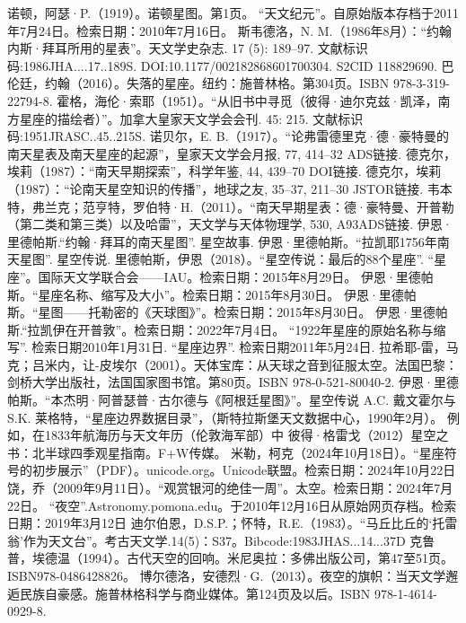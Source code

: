 \begin{enumerate}
 诺顿，阿瑟·P.（1919）。诺顿星图。第1页。
 “天文纪元”。自原始版本存档于2011年7月24日。检索日期：2010年7月16日。
 斯韦德洛，N. M.（1986年8月）：“约翰内斯·拜耳所用的星表”。天文学史杂志. 17 (5): 189–97. 文献标识码:1986JHA....17..189S. DOI:10.1177/002182868601700304. S2CID 118829690.
 巴伦廷，约翰（2016）。失落的星座。纽约：施普林格。第304页。ISBN 978-3-319-22794-8.
 霍格，海伦·索耶（1951）。“从旧书中寻觅（彼得·迪尔克兹·凯泽，南方星座的描绘者）”。加拿大皇家天文学会会刊. 45: 215. 文献标识码:1951JRASC..45..215S.
 诺贝尔，E. B.（1917）。“论弗雷德里克·德·豪特曼的南天星表及南天星座的起源”，皇家天文学会月报, 77, 414–32 ADS链接.
 德克尔，埃莉（1987）：“南天早期探索”，科学年鉴, 44, 439–70 DOI链接.
 德克尔，埃莉（1987）：“论南天星空知识的传播”，地球之友, 35–37, 211–30 JSTOR链接.
 韦本特，弗兰克；范亨特，罗伯特·H.（2011）。“南天早期星表：德·豪特曼、开普勒（第二类和第三类）以及哈雷”，天文学与天体物理学, 530, A93ADS链接.
 伊恩·里德帕斯.“约翰·拜耳的南天星图”. 星空故事.
 伊恩·里德帕斯。“拉凯耶1756年南天星图”. 星空传说.
 里德帕斯，伊恩（2018）。“星空传说：最后的88个星座”.
 “星座”。国际天文学联合会——IAU。检索日期：2015年8月29日。
 伊恩·里德帕斯。“星座名称、缩写及大小”。检索日期：2015年8月30日。
 伊恩·里德帕斯。“星图——托勒密的《天球图》”。检索日期：2015年8月30日。
 伊恩·里德帕斯.“拉凯伊在开普敦”。检索日期：2022年7月4日。
 “1922年星座的原始名称与缩写”. 检索日期2010年1月31日.
 “星座边界”. 检索日期2011年5月24日.
 拉希耶-雷，马克；吕米内，让-皮埃尔（2001）。天体宝库：从天球之音到征服太空。法国巴黎：剑桥大学出版社，法国国家图书馆。第80页。ISBN 978-0-521-80040-2.
 伊恩·里德帕斯。“本杰明·阿普瑟普·古尔德与《阿根廷星图》”。星空传说
 A.C. 戴文霍尔与S.K. 莱格特，“星座边界数据目录”，（斯特拉斯堡天文数据中心，1990年2月）。
 例如，在1833年航海历与天文年历（伦敦海军部）中
 彼得·格雷戈（2012）星空之书：北半球四季观星指南。F+W传媒。
 米勒，柯克（2024年10月18日）。“星座符号的初步展示”（PDF）。unicode.org。Unicode联盟。检索日期：2024年10月22日
 饶，乔（2009年9月11日）。“观赏银河的绝佳一周”。太空。检索日期：2024年7月22日。
 “夜空”.Astronomy.pomona.edu。于2010年12月16日从原始网页存档。检索日期：2019年3月12日
 迪尔伯恩，D.S.P.；怀特，R.E.（1983）。“马丘比丘的‘托雷翁’作为天文台”。考古天文学.14(5)：S37。Bibcode:1983JHAS...14...37D
 克鲁普，埃德温（1994）。古代天空的回响。米尼奥拉：多佛出版公司，第47至51页。ISBN978-0486428826。
 博尔德洛，安德烈·G.（2013）。夜空的旗帜：当天文学邂逅民族自豪感。施普林格科学与商业媒体。第124页及以后。ISBN 978-1-4614-0929-8.
\end{enumerate}